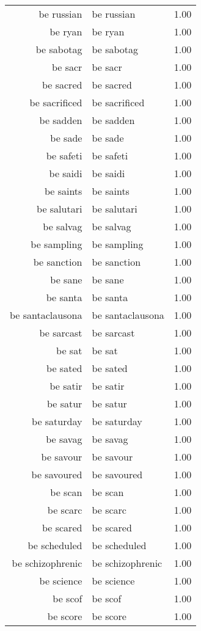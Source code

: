 \begin{table}[ht]
\begin{tabular}{rlr}
  be russian & be russian & 1.00 \\ 
  be ryan & be ryan & 1.00 \\ 
  be sabotag & be sabotag & 1.00 \\ 
  be sacr & be sacr & 1.00 \\ 
  be sacred & be sacred & 1.00 \\ 
  be sacrificed & be sacrificed & 1.00 \\ 
  be sadden & be sadden & 1.00 \\ 
  be sade & be sade & 1.00 \\ 
  be safeti & be safeti & 1.00 \\ 
  be saidi & be saidi & 1.00 \\ 
  be saints & be saints & 1.00 \\ 
  be salutari & be salutari & 1.00 \\ 
  be salvag & be salvag & 1.00 \\ 
  be sampling & be sampling & 1.00 \\ 
  be sanction & be sanction & 1.00 \\ 
  be sane & be sane & 1.00 \\ 
  be santa & be santa & 1.00 \\ 
  be santaclausona & be santaclausona & 1.00 \\ 
  be sarcast & be sarcast & 1.00 \\ 
  be sat & be sat & 1.00 \\ 
  be sated & be sated & 1.00 \\ 
  be satir & be satir & 1.00 \\ 
  be satur & be satur & 1.00 \\ 
  be saturday & be saturday & 1.00 \\ 
  be savag & be savag & 1.00 \\ 
  be savour & be savour & 1.00 \\ 
  be savoured & be savoured & 1.00 \\ 
  be scan & be scan & 1.00 \\ 
  be scarc & be scarc & 1.00 \\ 
  be scared & be scared & 1.00 \\ 
  be scheduled & be scheduled & 1.00 \\ 
  be schizophrenic & be schizophrenic & 1.00 \\ 
  be science & be science & 1.00 \\ 
  be scof & be scof & 1.00 \\ 
  be score & be score & 1.00 \\ 

\end{tabular}
\end{table}
